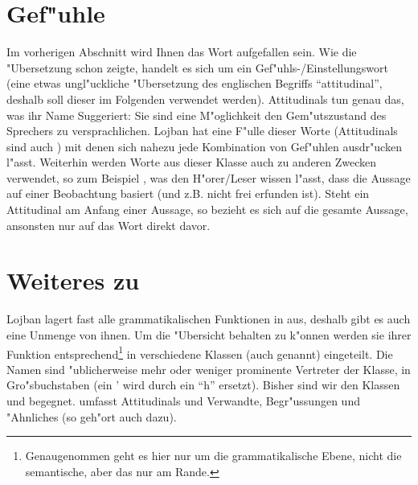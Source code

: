\section{Gef"uhle}
Im vorherigen Abschnitt wird Ihnen das Wort  aufgefallen sein. Wie die "Ubersetzung schon zeigte, handelt es sich um
ein Gef"uhls-/Einstellungswort (eine etwas ungl"uckliche "Ubersetzung des englischen Begriffs ``attitudinal'', deshalb soll dieser im
Folgenden verwendet werden).
Attitudinals tun genau das, was ihr Name Suggeriert: Sie sind eine M"oglichkeit den Gem"utszustand des Sprechers zu versprachlichen. Lojban hat eine F"ulle dieser Worte (Attitudinals sind auch ) mit denen sich nahezu jede Kombination von Gef"uhlen ausdr"ucken l"asst.
Weiterhin werden Worte aus dieser Klasse auch zu anderen Zwecken verwendet, so zum Beispiel , was den H"orer/Leser
wissen l"asst, dass die Aussage auf einer Beobachtung basiert (und z.B. nicht frei erfunden ist).
Steht ein Attitudinal am Anfang einer Aussage, so bezieht es sich auf die gesamte Aussage, ansonsten nur auf das Wort direkt davor.

\section{Weiteres zu }
Lojban lagert fast alle grammatikalischen Funktionen in  aus, deshalb gibt es auch eine Unmenge von ihnen. Um die "Ubersicht behalten zu k"onnen werden sie ihrer Funktion entsprechend\footnote{Genaugenommen geht es hier nur um die grammatikalische Ebene, nicht die semantische, aber das nur am Rande.}
in verschiedene Klassen (auch  genannt) eingeteilt. Die Namen sind "ublicherweise mehr oder weniger prominente Vertreter der Klasse, in Gro"sbuchstaben (ein ' wird durch ein ``h'' ersetzt).
Bisher sind wir den Klassen  und  begegnet.  umfasst Attitudinals und Verwandte,  Begr"ussungen und "Ahnliches (so geh"ort  auch dazu).
